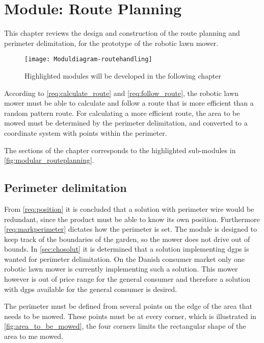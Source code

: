\graphicspath{{figures/route_planning/}}
\chapter{Module: Route Planning}\label{ch:modroute}
This chapter reviews the design and construction of the route planning and perimeter delimitation, for the prototype of the robotic lawn mower.

\begin{figure}[htb]
\centering
\texttt{[image: Moduldiagram-routehandling]}
\caption{Highlighted modules will be developed in the following chapter}
\label{fig:modular_routeplanning}
\end{figure}

According to \autoref{req:calculate_route} and \autoref{req:follow_route}, the robotic lawn mower must be able to calculate and follow a route that is more efficient than a random pattern route. For calculating a more efficient route, the area to be mowed must be determined by the perimeter delimitation, and converted to a coordinate system with points within the perimeter. 

The sections of the chapter corresponds to the highlighted sub-modules in \autoref{fig:modular_routeplanning}.

\section{Perimeter delimitation}\label{sec:per_def}
From \autoref{req:position} it is concluded that a solution with perimeter wire would be redundant, since the product must be able to know its own position. Furthermore \autoref{req:markperimeter} dictates how the perimeter is set. The module is designed to keep track of the boundaries of the garden, so the mower does not drive out of bounds. In \autoref{sec:chosolut} it is determined that a solution implementing \gls{dgps} is wanted for perimeter delimitation. On the Danish consumer market only one robotic lawn mower is currently implementing such a solution. This mower however is out of price range for the general consumer and therefore a solution with \gls{dgps} available for the general consumer is desired.

The perimeter must be defined from several points on the edge of the area that needs to be mowed. These points must be at every corner, which is illustrated in \autoref{fig:area_to_be_mowed}, the four corners limits the rectangular shape of the area to me mowed.
                         
